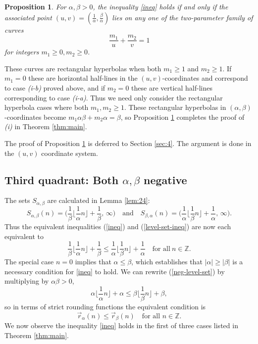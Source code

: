 \documentclass[12pt,letterpaper, reqno]{amsart}
\newtheorem{prop}[thm]{Proposition}
\theoremstyle{definition}
\theoremstyle{remark}
\newcommand{\ZZ}{\ensuremath{\mathbb{Z}}}
\newcommand{\floor}[1]{\lfloor{#1}\rfloor}
\begin{document}
%
%
\begin{prop}\label{prop:31}
For $\alpha, \beta >0$, the inequality \eqref{ineq} holds if and only if the associated point $(u, v)= (\frac{1}{\alpha}, \frac{\beta}{\alpha})$ lies on any one of the two-parameter family of curves
$$\frac{m_1}{u} + \frac{m_2}{v} =1$$
 for integers $m_1 \ge 0, m_2 \ge 0$.
\end{prop}
These curves are rectangular hyperbolas when both $m_1 \ge 1$ and $m_2 \ge1$. If $m_1=0$ these are horizontal half-lines in the $(u,v)$-coordinates and correspond to  case {\it (i-b)} proved above, and if $m_2=0$ these are vertical half-lines corresponding to case {\it (i-a)}.
Thus we need only
consider the rectangular hyperbola cases where both $m_1, m_2 \ge 1$.
These rectangular hyperbolas in $(\alpha, \beta)$-coordinates
become $m_1 \alpha \beta + m_2 \alpha= \beta$,
so  Proposition \ref{prop:31} completes the proof of {\it (i)} in
Theorem \ref{thm:main}.


The  proof of Proposition \ref{prop:31} is deferred to
 Section \ref{sec:4}. 
The  argument is done in the $(u, v)$ coordinate system.


%
%
\subsection{Third quadrant: Both $\alpha, \beta$  negative}\label{sec:rounding-3quad}
The sets $S_{\alpha,\beta}$ are calculated in Lemma \ref{lem:24}:
\[ 
S_{\alpha,\beta}(n)  = \bigg( \frac{1}{\beta} \floor{\frac{1}{\alpha}n} +\frac{1}{\beta},\, \infty\bigg)
\quad\text{and}\quad
 S_{\beta,\alpha}(n) = \bigg( \frac{1}{\alpha} \floor{\frac{1}{\beta}n} +\frac 1\alpha, \,\infty \bigg).
 \]
Thus the equivalent inequalities (\ref{ineq}) and (\ref{level-set-ineq}) are now each  equivalent to 
\begin{equation}\label{neg-level-set}
\frac1\beta \floor{ \frac{1}{\alpha}n}+\frac{1}{\beta} \leq \frac{1}{\alpha} \floor{\frac{1}{\beta}n} +\frac{1}{\alpha} \quad\text{for all}\ n\in\ZZ.\end{equation}
The special case  $n=0$ implies  that  $\alpha \leq \beta$, which establishes that 
$|\alpha| \ge |\beta|$ is a necessary condition for  \eqref{ineq} to hold. 
We can rewrite (\ref{neg-level-set}) by multiplying by $\alpha\beta>0$,
\begin{equation}\label{neg-level-set2}
 \alpha\floor{\frac{1}{\alpha} n} + \alpha \leq \beta\floor{\frac{1}{\beta} n} + \beta,
 \end{equation}
so in terms of strict rounding functions the equivalent condition is
\begin{equation}\label{neg-rounding-ineq}
\vec{r}_\alpha(n) \leq \vec{r}_\beta(n) \quad\text{for all }n\in\ZZ.
\end{equation}
We now observe the inequality \eqref{ineq} holds in the first of three cases listed in Theorem \ref{thm:main}.\medskip
\end{document}
